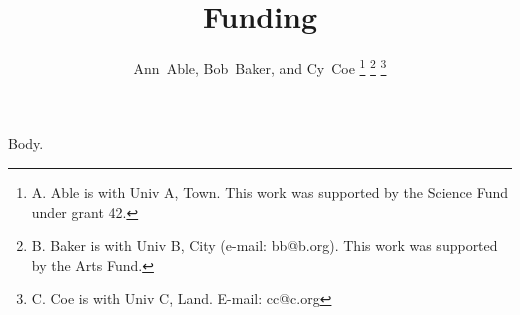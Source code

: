 \documentclass[journal]{IEEEtran}
\begin{document}
\title{Funding}
\author{Ann~Able, Bob~Baker, and Cy~Coe%
\thanks{A. Able is with Univ A, Town. This work was supported by the Science Fund under grant 42.}
\thanks{B. Baker is with Univ B, City (e-mail: bb@b.org). This work was supported by the Arts Fund.}
\thanks{C. Coe is with Univ C, Land. E-mail: cc@c.org}}
\maketitle
Body.
\end{document}
